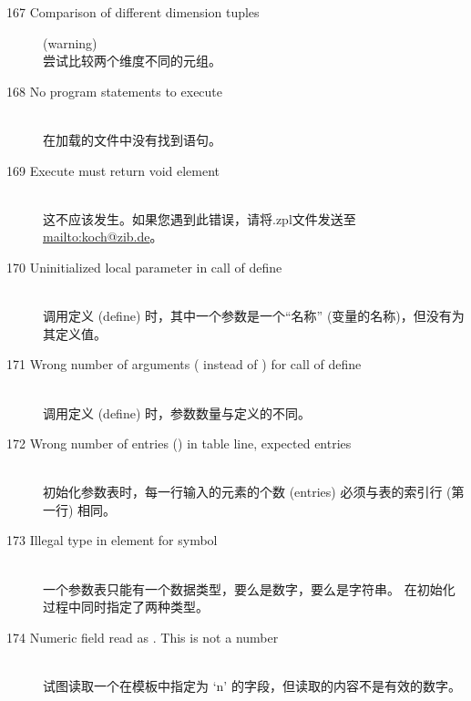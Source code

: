\begin{description}
\item[167 Comparison of different dimension tuples] (warning)\ \\
  尝试比较两个维度不同的元组。
%
%
\item[168 No program statements to execute]\ \\
  在加载的文件中没有找到\zimpl 语句。
%
%
\item[169 Execute must return void element]\ \\
  这不应该发生。如果您遇到此错误，请将.zpl文件发送至\url{mailto:koch@zib.de}。
%
%
\item[170 Uninitialized local parameter  in call of
  define ]\ \\
  调用定义 (define) 时，其中一个参数是一个``名称''
  (变量的名称)，但没有为其定义值。
\item[171 Wrong number of arguments ( instead of )
  for call of define ]\ \\
  调用定义 (define) 时，参数数量与定义的不同。
\item[172 Wrong number of entries () in table line, 
  expected  entries]\ \\
  初始化参数表时，每一行输入的元素的个数 (entries)
  必须与表的索引行 (第一行) 相同。
\item[173 Illegal type in element  for symbol]\ \\
  一个参数表只能有一个数据类型，要么是数字，要么是字符串。
  在初始化过程中同时指定了两种类型。
%
%
\item[174 Numeric field  read as . This is not a
  number]\ \\
  试图读取一个在模板中指定为 `n' 的字段，但读取的内容不是有效的数字。

\end{description}
